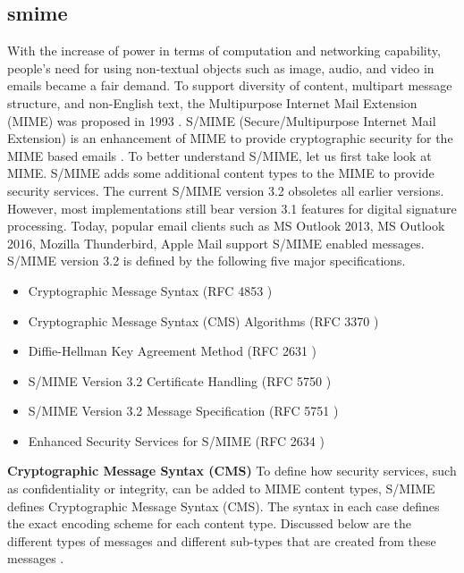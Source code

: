 \subsection{\acrfull{smime}}
\label{chap:analysis-smime}

With the increase of power in terms of computation and networking capability, people's need for using non-textual objects such as image, audio, and video in emails became a fair demand. To support diversity of content, multipart message structure, and non-English text, the Multipurpose Internet Mail Extension (MIME) was proposed in 1993 \cite{rfc1521}. S/MIME (Secure/Multipurpose Internet Mail Extension) is an enhancement of MIME to provide cryptographic security for the MIME based emails \cite{rfc1521}. To better understand S/MIME, let us first take look at MIME.
S/MIME adds some additional content types to the MIME to provide security services. The current S/MIME version 3.2 obsoletes all earlier versions. However, most implementations still bear version 3.1 features for digital signature processing. Today, popular email clients such as MS Outlook 2013, MS Outlook 2016, Mozilla Thunderbird, Apple Mail support S/MIME enabled messages.
S/MIME version 3.2 is defined by the following five major specifications.
\begin{itemize}
\item Cryptographic Message Syntax (RFC 4853 \cite{rfc4853})
\item Cryptographic Message Syntax (CMS) Algorithms (RFC 3370 \cite{rfc3370})
\item Diffie-Hellman Key Agreement Method (RFC 2631 \cite{rfc2631})
\item S/MIME Version 3.2 Certificate Handling (RFC 5750 \cite{rfc5750})
\item S/MIME Version 3.2 Message Specification (RFC 5751 \cite{rfc5751})
\item Enhanced Security Services for S/MIME (RFC 2634 \cite{rfc2634})
\end{itemize}
\textbf{Cryptographic Message Syntax (CMS)}
To define how security services, such as confidentiality or integrity, can be added to MIME content types, S/MIME defines Cryptographic Message Syntax (CMS). The syntax in each case defines the exact encoding scheme for each content type. Discussed below are the different types of messages and different sub-types that are created from these messages \cite{PKCS-7}.
